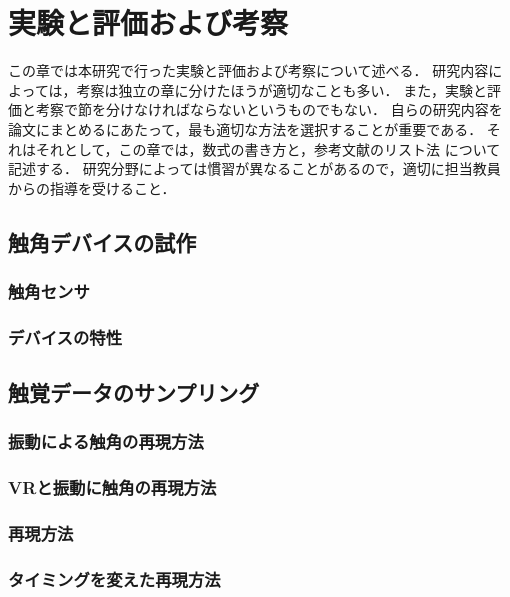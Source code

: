 \chapter{実験と評価および考察}	%
\thispagestyle{plain}   %

この章では本研究で行った実験と評価および考察について述べる．
研究内容によっては，考察は独立の章に分けたほうが適切なことも多い．
また，実験と評価と考察で節を分けなければならないというものでもない．
自らの研究内容を論文にまとめるにあたって，最も適切な方法を選択することが重要である．
それはそれとして，この章では，数式の書き方と，参考文献のリスト法
について記述する．
研究分野によっては慣習が異なることがあるので，適切に担当教員からの指導を受けること．

\section{触角デバイスの試作}
\subsection{触角センサ}
\subsection{デバイスの特性}

\section{触覚データのサンプリング}
\subsection{振動による触角の再現方法}
\subsection{VRと振動に触角の再現方法}
\subsection{再現方法}
\subsection{タイミングを変えた再現方法}